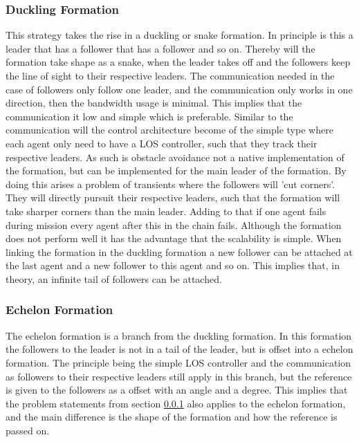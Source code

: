 \subsubsection{Duckling Formation}
\label{sc:duckling}
This strategy takes the rise in a duckling or snake formation. In principle is this a leader that has a follower that has a follower and so on. Thereby will the formation take shape as a snake, when the leader takes off and the followers keep the line of sight to their respective leaders. The communication needed in the case of followers only follow one leader, and the communication only works in one direction, then the bandwidth usage is minimal. This implies that the communication it low and simple which is preferable. Similar to the communication will the control architecture become of the simple type where each agent only need to have a \ac{LOS} controller, such that they track their respective leaders. As such is obstacle avoidance not a native implementation of the formation, but can be implemented for the main leader of the formation. By doing this arises a problem of transients where the followers will 'cut corners'. They will directly pursuit their respective leaders, such that the formation will take sharper corners than the main leader. Adding to that if one agent fails during mission every agent after this in the chain fails. Although the formation does not perform well it has the advantage that the scalability is simple. When linking the formation in the duckling formation a new follower can be attached at the last agent and a new follower to this agent and so on. This implies that, in theory, an infinite tail of followers can be attached.

\subsubsection{Echelon Formation}
The echelon formation is a branch from the duckling formation. In this formation the followers to the leader is not in a tail of the leader, but is offset into a echelon formation. The principle being the simple \ac{LOS} controller and the communication as followers to their respective leaders still apply in this branch, but the reference is given to the followers as a offset with an angle and a degree. This implies that the problem statements from section \ref{sc:duckling} also applies to the echelon formation, and the main difference is the shape of the formation and how the reference is passed on.

